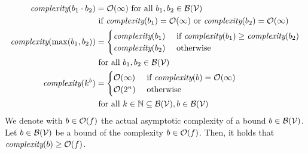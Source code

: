 \begin{theorem}
\begin{align*}
    \emph{complexity}(b_1 \cdot b_2) &= \mathcal{O}(\infty) \text{ for all } b_1, b_2 \in \mathcal{B}(\mathcal{V}) \\
    & \text{ if } \emph{complexity}(b_1)=\mathcal{O}(\infty) \text{ or } \emph{complexity}(b_2)=\mathcal{O}(\infty) \\
    \emph{complexity}(\max(b_1, b_2)) &=
    \begin{cases}
      \emph{complexity}(b_1) & \text{ if } \emph{complexity}(b_1) \geq \emph{complexity}(b_2) \\
      \emph{complexity}(b_2) & \text{ otherwise }
    \end{cases} \\
    & \text{ for all } b_1, b_2 \in \mathcal{B}(\mathcal{V}) \\
    \emph{complexity}(k^b) &=
    \begin{cases}
      \mathcal{O}(\infty) & \text{ if } \emph{complexity}(b)=\mathcal{O}(\infty) \\
      \mathcal{O}(2^n) & \text{ otherwise }
    \end{cases} \\
    & \text{ for all } k \in \mathbb{N} \subseteq \mathcal{B}(\mathcal{V}), b \in \mathcal{B}(\mathcal{V})
  \end{align*}
  We denote with $b \in \mathcal{O}(f)$ the actual asymptotic complexity of a bound $b \in \mathcal{B}(\mathcal{V})$.
  Let $b \in \mathcal{B}(\mathcal{V})$ be a bound of the complexity $b \in \mathcal{O}(f)$.
  Then, it holds that $\emph{complexity}(b) \geq \mathcal{O}(f)$.
\end{theorem}
